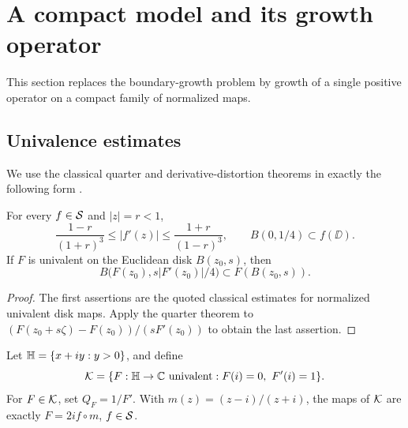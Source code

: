 \section{A compact model and its growth operator}\label{sec:operator}

This section replaces the boundary-growth problem by growth of a
single positive operator on a compact family of normalized maps.

\subsection{Univalence estimates}

We use the classical quarter and derivative-distortion theorems in
exactly the following form \cite[Chapter 2]{Duren}.

\begin{lemma}\label{lem:classical}
For every \(f\in\mathcal S\) and \(|z|=r<1\),
\begin{equation}\label{eq:koebe}
 \frac{1-r}{(1+r)^3}\le |f'(z)|\le
 \frac{1+r}{(1-r)^3},\qquad
 B(0,1/4)\subset f(\DD).
\end{equation}
If \(F\) is univalent on the Euclidean disk \(B(z_0,s)\), then
\begin{equation}\label{eq:local-quarter}
 B\bigl(F(z_0),s|F'(z_0)|/4\bigr)
 \subset F(B(z_0,s)).
\end{equation}
\end{lemma}
\begin{proof}
The first assertions are the quoted classical estimates for normalized
univalent disk maps. Apply the quarter theorem to
\((F(z_0+s\zeta)-F(z_0))/(sF'(z_0))\) to obtain the last assertion.
\end{proof}

Let \(\mathbb H=\{x+iy:y>0\}\), and define
\[
 \mathcal K=\{F:\mathbb H\to\mathbb C\text{ univalent}:F(i)=0,\ F'(i)=1\}.
\]
For \(F\in\mathcal K\), set \(Q_F=1/F'\).
With \(m(z)=(z-i)/(z+i)\), the maps of \(\mathcal K\) are exactly
\(F=2i f\circ m\), \(f\in\mathcal S\).

